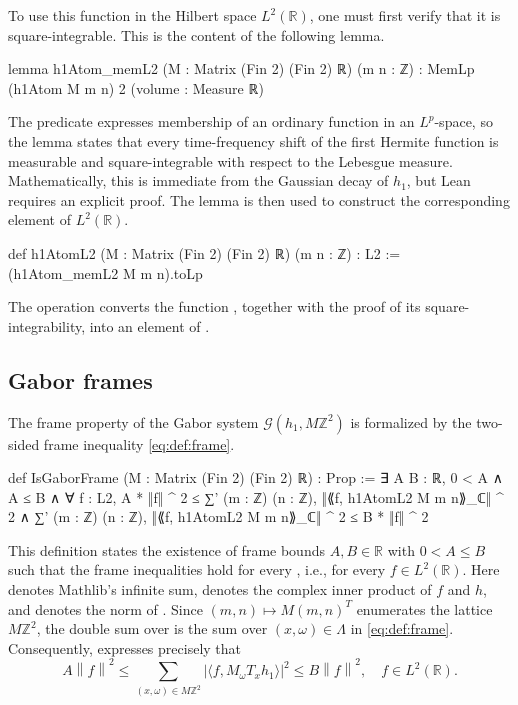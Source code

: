 \documentclass[reqno,a4paper,12pt]{amsart}
\numberwithin{equation}{section}
\newcommand{\Z}{\mathbb Z}
\newcommand{\R}{\mathbb R}
\newcommand{\calG}{\mathcal G}
\newcommand{\norm}[1]{\left\lVert #1 \right\rVert}
\begin{document}
To use this function in the Hilbert space $L^2(\R)$, one must first verify that it is square-integrable. This is the content of the following lemma.

\begin{leancode}
lemma h1Atom_memL2 (M : Matrix (Fin 2) (Fin 2) ℝ) (m n : ℤ) :
    MemLp (h1Atom M m n) 2 (volume : Measure ℝ)
\end{leancode}

The predicate  expresses membership of an ordinary function in an $L^p$-space, so the lemma  states that every time-frequency shift of the first Hermite function is measurable and square-integrable with respect to the Lebesgue measure. Mathematically, this is immediate from the Gaussian decay of $h_1$, but Lean requires an explicit proof. The lemma is then used to construct the corresponding element of $L^2(\R)$.

\begin{leancode}
def h1AtomL2 (M : Matrix (Fin 2) (Fin 2) ℝ) (m n : ℤ) : L2 :=
    (h1Atom_memL2 M m n).toLp
\end{leancode}

The operation  converts the function , together with the proof of its square-integrability, into an element of .

\subsection{Gabor frames}

The frame property of the Gabor system $\calG(h_1,M\Z^2)$ is formalized by the two-sided frame inequality \eqref{eq:def:frame}.

\begin{leancode}
def IsGaborFrame (M : Matrix (Fin 2) (Fin 2) ℝ) : Prop :=
  ∃ A B : ℝ, 0 < A ∧ A ≤ B ∧ ∀ f : L2,
    A * ‖f‖ ^ 2 ≤ ∑' (m : ℤ) (n : ℤ), ‖⟪f, h1AtomL2 M m n⟫_ℂ‖ ^ 2 ∧
    ∑' (m : ℤ) (n : ℤ), ‖⟪f, h1AtomL2 M m n⟫_ℂ‖ ^ 2 ≤ B * ‖f‖ ^ 2
\end{leancode}

This definition states the existence of frame bounds $A,B\in\R$ with $0<A\leq B$ such that the frame inequalities hold for every , i.e., for every $f\in L^2(\R)$. Here  denotes Mathlib's infinite sum,  denotes the complex inner product of $f$ and $h$, and  denotes the norm of . Since $(m,n)\mapsto M(m,n)^{T}$ enumerates the lattice $M\Z^2$, the double sum over  is the sum over $(x,\omega)\in\Lambda$ in \eqref{eq:def:frame}. Consequently,  expresses precisely that
\begin{equation*}
    A\norm{f}^2
    \leq
    \sum_{(x,\omega)\in M\Z^2}|\langle f,M_\omega T_x h_1\rangle|^2
    \leq
    B\norm{f}^2,\quad f\in L^2(\R).
\end{equation*}
\end{document}
